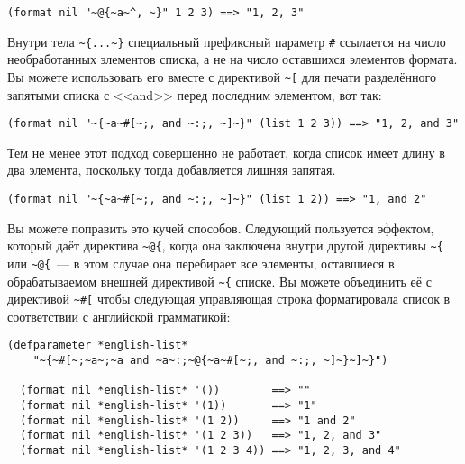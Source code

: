\begin{lstlisting}[style=lisprepl]
  (format nil "~@{~a~^, ~}" 1 2 3) ==> "1, 2, 3"
\end{lstlisting}

Внутри тела \lstinline!~{...~}! специальный префиксный параметр \lstinline!#! ссылается на число необработанных элементов списка, а
не на число оставшихся элементов формата. Вы можете использовать его вместе с директивой \lstinline!~[! для печати
разделённого запятыми списка с <<and>> перед последним элементом, вот так:

\begin{lstlisting}[style=lisprepl]
  (format nil "~{~a~#[~;, and ~:;, ~]~}" (list 1 2 3)) ==> "1, 2, and 3"
\end{lstlisting}

Тем не менее этот подход совершенно не работает, когда список имеет длину в два элемента,
поскольку тогда добавляется лишняя запятая.

\begin{lstlisting}[style=lisprepl]
  (format nil "~{~a~#[~;, and ~:;, ~]~}" (list 1 2)) ==> "1, and 2"
\end{lstlisting}

Вы можете поправить это кучей способов. Следующий пользуется эффектом, который даёт директива \lstinline!~@{!, когда она
заключена внутри другой директивы \lstinline!~{! или \lstinline!~@{!~--- в этом случае она перебирает все элементы, оставшиеся в
обрабатываемом внешней директивой \lstinline!~{! списке. Вы можете объединить её с директивой \lstinline!~#[! чтобы следующая
управляющая строка форматировала список в соответствии с английской грамматикой:

\begin{lstlisting}[style=lisprepl]
  (defparameter *english-list*
    "~{~#[~;~a~;~a and ~a~:;~@{~a~#[~;, and ~:;, ~]~}~]~}")

  (format nil *english-list* '())        ==> ""
  (format nil *english-list* '(1))       ==> "1"
  (format nil *english-list* '(1 2))     ==> "1 and 2"
  (format nil *english-list* '(1 2 3))   ==> "1, 2, and 3"
  (format nil *english-list* '(1 2 3 4)) ==> "1, 2, 3, and 4"
\end{lstlisting}

